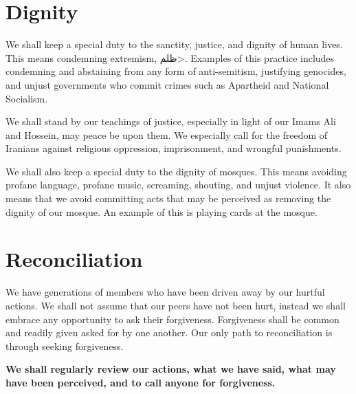 \documentclass{article}
\begin{document}

\section{Dignity}
We shall keep a special duty to the sanctity, justice, and dignity of human lives.
This means condemning extremism, \<ظلم>.
Examples of this practice includes condemning and abstaining from any form of anti-semitism, justifying genocides, and unjust governments who commit crimes such as Apartheid and National Socialism.

We shall stand by our teachings of justice, especially in light of our Imams Ali and Hossein, may peace be upon them.
We especially call for the freedom of Iranians against religious oppression, imprisonment, and wrongful punishments.

We shall also keep a special duty to the dignity of mosques.
This means avoiding profane language, profane music, screaming, shouting, and unjust violence.
It also means that we avoid committing acts that may be perceived as removing the dignity of our mosque.
An example of this is playing cards at the mosque.

\section{Reconciliation}
We have generations of members who have been driven away by our hurtful actions.
We shall not assume that our peers have not been hurt, instead we shall embrace any opportunity to ask their forgiveness.
Forgiveness shall be common and readily given asked for by one another.
Our only path to reconciliation is through seeking forgiveness.

\textbf{We shall regularly review our actions, what we have said, what may have been perceived, and to call anyone for forgiveness. }


\end{document}
